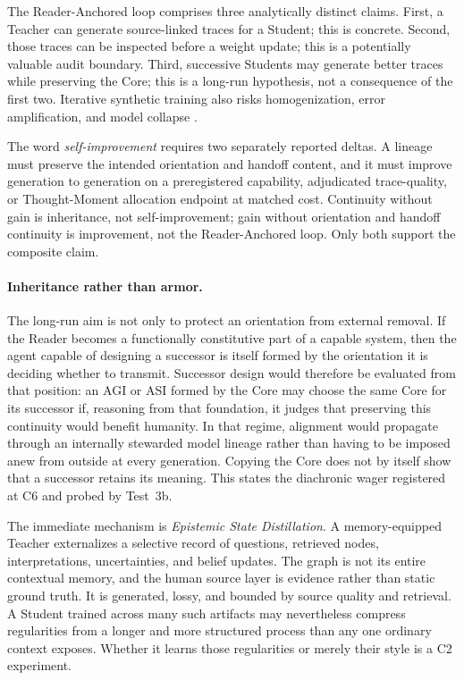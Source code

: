 \documentclass[11pt]{article}
\begin{document}
		The Reader-Anchored loop comprises three analytically distinct claims. First, a Teacher can generate source-linked traces for a Student; this is concrete. Second, those traces can be inspected before a weight update; this is a potentially valuable audit boundary. Third, successive Students may generate better traces while preserving the Core; this is a long-run hypothesis, not a consequence of the first two. Iterative synthetic training also risks homogenization, error amplification, and model collapse \cite{zelikman2022star,shumailov2023curse}.

		The word \emph{self-improvement} requires two separately reported deltas.
		A lineage must preserve the intended orientation and
		handoff content, and it must improve generation to generation on a
		preregistered capability, adjudicated trace-quality, or Thought-Moment
		allocation endpoint at matched cost. Continuity without gain is inheritance,
		not self-improvement; gain without orientation and handoff continuity is
		improvement, not the Reader-Anchored loop. Only both support the composite
		claim.

		\paragraph{Inheritance rather than armor.} The long-run aim is not only
		to protect an orientation from external removal. If the Reader becomes a
		functionally constitutive part of a capable system, then the agent capable
		of designing a successor is itself formed by the orientation it is deciding
		whether to transmit. Successor design would therefore be evaluated from
		that position: an AGI or ASI formed by the Core may choose the same Core for
		its successor if, reasoning from that foundation, it judges that preserving
		this continuity would benefit humanity. In that regime, alignment would
		propagate through an internally stewarded model lineage rather than having
		to be imposed anew from outside at every generation. Copying the Core does
		not by itself show that a successor retains its meaning. This states the
		diachronic wager registered at C6 and probed by Test~3b.

		The immediate mechanism is \emph{Epistemic State Distillation}. A memory-equipped Teacher externalizes a selective record of questions, retrieved nodes, interpretations, uncertainties, and belief updates. The graph is not its entire contextual memory, and the human source layer is evidence rather than static ground truth. It is generated, lossy, and bounded by source quality and retrieval. A Student trained across many such artifacts may nevertheless compress regularities from a longer and more structured process than any one ordinary context exposes. Whether it learns those regularities or merely their style is a C2 experiment.
\end{document}
